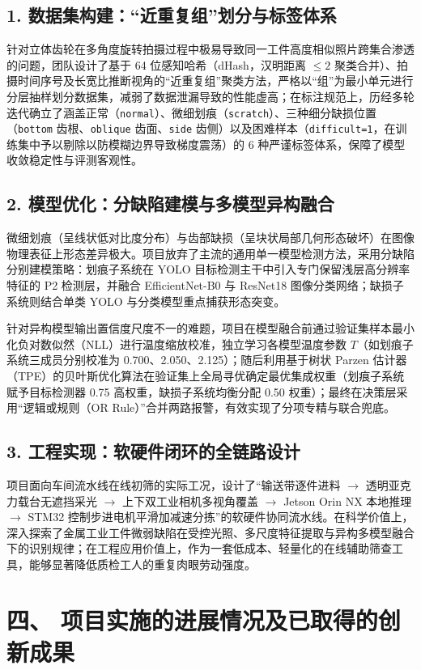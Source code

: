 \subsection*{1. 数据集构建：“近重复组”划分与标签体系}
针对立体齿轮在多角度旋转拍摄过程中极易导致同一工件高度相似照片跨集合渗透的问题，团队设计了基于 64 位感知哈希（dHash，汉明距离 $\le 2$ 聚类合并）、拍摄时间序号及长宽比推断视角的“近重复组”聚类方法，严格以“组”为最小单元进行分层抽样划分数据集，减弱了数据泄漏导致的性能虚高；在标注规范上，历经多轮迭代确立了涵盖正常（\texttt{normal}）、微细划痕（\texttt{scratch}）、三种细分缺损位置（\texttt{bottom} 齿根、\texttt{oblique} 齿面、\texttt{side} 齿侧）以及困难样本（\texttt{difficult=1}，在训练集中予以剔除以防模糊边界导致梯度震荡）的 6 种严谨标签体系，保障了模型收敛稳定性与评测客观性。

\subsection*{2. 模型优化：分缺陷建模与多模型异构融合}
微细划痕（呈线状低对比度分布）与齿部缺损（呈块状局部几何形态破坏）在图像物理表征上形态差异极大。项目放弃了主流的通用单一模型检测方法，采用分缺陷分别建模策略：划痕子系统在 YOLO 目标检测主干中引入专门保留浅层高分辨率特征的 P2 检测层，并融合 EfficientNet-B0 与 ResNet18 图像分类网络；缺损子系统则结合单类 YOLO 与分类模型重点捕获形态突变。

针对异构模型输出置信度尺度不一的难题，项目在模型融合前通过验证集样本最小化负对数似然（NLL）进行温度缩放校准，独立学习各模型温度参数 $T$（如划痕子系统三成员分别校准为 0.700、2.050、2.125）；随后利用基于树状 Parzen 估计器（TPE）的贝叶斯优化算法在验证集上全局寻优确定最优集成权重（划痕子系统赋予目标检测器 0.75 高权重，缺损子系统均衡分配 0.50 权重）；最终在决策层采用“逻辑或规则（OR Rule）”合并两路报警，有效实现了分项专精与联合兜底。

\subsection*{3. 工程实现：软硬件闭环的全链路设计}
项目面向车间流水线在线初筛的实际工况，设计了“输送带逐件进料 $\rightarrow$ 透明亚克力载台无遮挡采光 $\rightarrow$ 上下双工业相机多视角覆盖 $\rightarrow$ Jetson Orin NX 本地推理 $\rightarrow$ STM32 控制步进电机平滑加减速分拣”的软硬件协同流水线。在科学价值上，深入探索了金属工业工件微弱缺陷在受控光照、多尺度特征提取与异构多模型融合下的识别规律；在工程应用价值上，作为一套低成本、轻量化的在线辅助筛查工具，能够显著降低质检工人的重复肉眼劳动强度。

\section*{四、 项目实施的进展情况及已取得的创新成果}

